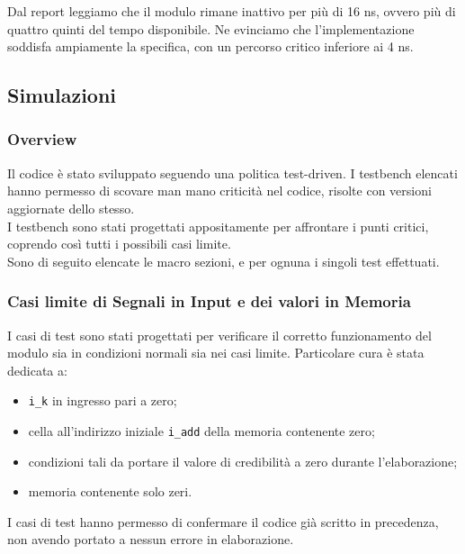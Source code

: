 \documentclass{article}
\begin{document}
Dal report leggiamo che il modulo rimane inattivo per più di 16 ns, ovvero più di quattro quinti del tempo disponibile.
Ne evinciamo che l'implementazione soddisfa ampiamente la specifica, con un percorso critico inferiore ai 4 ns. 

\bigskip
\subsection{Simulazioni}
\subsubsection{Overview}
Il codice è stato sviluppato seguendo una politica test-driven. I testbench elencati hanno permesso di scovare man mano criticità nel codice, risolte con versioni aggiornate dello stesso.
\smallskip \\ I testbench sono stati progettati appositamente per affrontare i punti critici, coprendo così tutti i possibili casi limite.
\smallskip \\ Sono di seguito elencate le macro sezioni, e per ognuna i singoli test effettuati.
\subsubsection{Casi limite di Segnali in Input e dei valori in Memoria}
    I casi di test sono stati progettati per verificare il corretto funzionamento del modulo sia in condizioni normali sia nei casi limite. Particolare cura è stata dedicata a:
    \begin{itemize}[label=\raisebox{0.25ex}{\tiny$\bullet$}]
        \setlength{\itemsep}{0pt}
        \item \texttt{i\_k} in ingresso pari a zero;
        \item cella all'indirizzo iniziale \texttt{i\_add} della memoria contenente zero;
        \item condizioni tali da portare il valore di credibilità a zero durante l'elaborazione;
        \item memoria contenente solo zeri.
    \end{itemize}
    I casi di test hanno permesso di confermare il codice già scritto in precedenza, non avendo portato a nessun errore in elaborazione.
\end{document}
